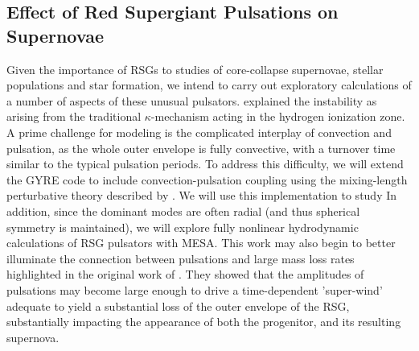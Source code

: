 \subsection{Effect of Red Supergiant Pulsations on Supernovae}

Given the importance of RSGs to studies of core-collapse supernovae, stellar populations and star formation, we intend to carry out exploratory calculations of a number of aspects of these unusual pulsators. 
\citet{1997AampA...327..224H}  explained the instability  as arising from the traditional $\kappa$-mechanism acting in the hydrogen ionization zone. A prime challenge for  modeling is the complicated interplay of convection and pulsation, as the whole outer envelope is fully convective, with a turnover time similar to the typical pulsation periods.   To address this difficulty, we will extend the GYRE code to include convection-pulsation coupling using the mixing-length perturbative theory described by \citet{Grigahcene:2005}. We will use this implementation to study
In addition, since the dominant modes are often radial (and thus spherical symmetry is maintained), we will explore fully nonlinear hydrodynamic calculations of RSG pulsators with MESA.  This work may also begin to better illuminate the connection between pulsations and large mass loss rates highlighted in the original work of \citet{Yoon_2010}. They showed that the amplitudes of pulsations may become large enough to drive a time-dependent 'super-wind' adequate to yield a substantial loss of the outer envelope of the RSG, substantially impacting the appearance of both the progenitor, and its resulting supernova.



